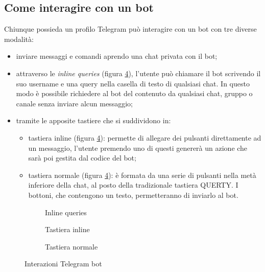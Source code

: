 \subsection{Come interagire con un bot}
Chiunque possieda un profilo Telegram può interagire con un bot con tre diverse modalità:
\begin{itemize}
\item inviare messaggi e comandi aprendo una chat privata con il bot;
\item attraverso le \textit{inline queries} (figura \ref{fig:telegram_interactions}), l'utente può chiamare il bot scrivendo il suo username e una query nella casella di testo di qualsiasi chat. In questo modo è possibile richiedere al bot del contenuto da qualsiasi chat, gruppo o canale senza inviare alcun messaggio;
\item tramite le apposite tastiere che si suddividono in: 
\begin{itemize}
\item tastiera inline (figura \ref{fig:telegram_interactions}): permette di allegare dei pulsanti direttamente ad un messaggio, l'utente premendo uno di questi genererà un azione che sarà poi gestita dal codice del bot; 
\item tastiera normale (figura \ref{fig:telegram_interactions}): è formata da una serie di pulsanti nella metà inferiore della chat, al posto della tradizionale tastiera QUERTY. I bottoni, che contengono un testo, permetteranno di inviarlo al bot. 
\end{itemize}
\end{itemize}

\begin{figure}[htb]
    \centering 
\begin{subfigure}{0.25\textwidth}
\caption{Inline queries}
\label{fig:inline_queries}
\end{subfigure}\hfil
\begin{subfigure}{0.25\textwidth}
\caption{Tastiera inline}
\label{fig:inline_keyboard}
\end{subfigure}\hfil 
\begin{subfigure}{0.25\textwidth}
\caption{Tastiera normale}
\label{fig:normal_keyboard}
\end{subfigure}

\caption{
\label{fig:telegram_interactions}Interazioni Telegram bot}
\end{figure}

